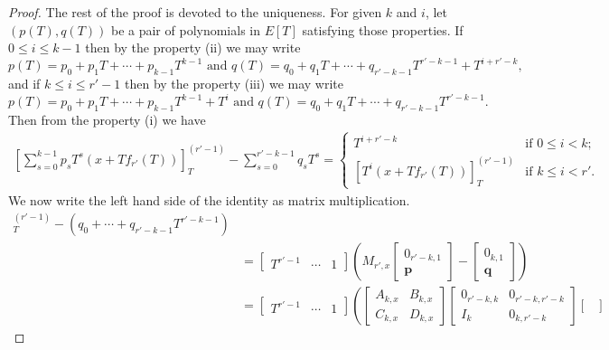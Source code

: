\documentclass[11pt]{amsart}
\theoremstyle{definition}
\numberwithin{equation}{subsection}
\theoremstyle{plain}
\theoremstyle{plain}
\theoremstyle{plain}
\theoremstyle{plain}
\theoremstyle{plain}
\theoremstyle{plain}
\theoremstyle{plain}
\theoremstyle{plain}
\theoremstyle{plain}
\theoremstyle{plain}
\theoremstyle{plain}
\theoremstyle{plain}
\theoremstyle{definition}
\theoremstyle{definition}
\theoremstyle{definition}
\theoremstyle{remark}
\renewcommand{\(}{\textup{(}}
\renewcommand{\)}{\textup{)}}
\begin{document}
\begin{proof}
The rest of the proof is devoted to the uniqueness. For given $k$ and $i$, let $(p(T),q(T))$ be a pair of polynomials in $E[T]$ satisfying those properties. If $0\leq i\leq k-1$ then by the property (ii) we may write
$$p(T)=p_0+p_1T+\cdots+p_{k-1}T^{k-1}\,\,\mbox{and}\,\, q(T)=q_0+q_1T+\cdots+q_{r'-k-1}T^{r'-k-1}+T^{i+r'-k},$$
and if $k\leq i\leq r'-1$ then by the property (iii) we may write
$$p(T)=p_0+p_1T+\cdots+p_{k-1}T^{k-1}+T^i\,\,\mbox{and}\,\,q(T)=q_0+q_1T+\cdots+q_{r'-k-1}T^{r'-k-1}.$$
Then from the property (i) we have
\begin{align*}
\left[\sum_{s=0}^{k-1}p_sT^s(x+Tf_{r'}(T))\right]_{T}^{(r'-1)}-\sum_{s=0}^{r'-k-1}q_sT^s=
 \begin{cases}
 T^{i+r'-k}&\mbox{if }0\leq i<k;\\
 [T^i(x+Tf_{r'}(T))]_{T}^{(r'-1)}&\mbox{if }k\leq i<r'.
 \end{cases}
\end{align*}
We now write the left hand side of the identity as matrix multiplication.
\begin{align*}
[&(p_0+\cdots+p_{k-1}T^{k-1})(x+Tf_{r'}(T))]_{T}^{(r'-1)}-(q_0+\cdots+q_{r'-k-1}T^{r'-k-1})\\
&=
        \begin{bmatrix}
            T^{r'-1} & \cdots & 1
        \end{bmatrix}
        \left(
        M_{r',x}
        \begin{bmatrix}
            0_{r'-k,1}\\
            \mathbf{p}
        \end{bmatrix}
        -
        \begin{bmatrix}
            0_{k,1}\\
            \mathbf{q}
        \end{bmatrix}
        \right)\\
&=
        \begin{bmatrix}
            T^{r'-1} & \cdots & 1
        \end{bmatrix}
        \left(
        \begin{bmatrix}
            A_{k,x} & B_{k,x} \\
            C_{k,x} & D_{k,x}
        \end{bmatrix}
        \begin{bmatrix}
            0_{r'-k,k} & 0_{r'-k,r'-k} \\
            I_k & 0_{k,r'-k}
        \end{bmatrix}
        \begin{bmatrix}

\end{bmatrix}
\end{align*}
\end{proof}
\end{document}
